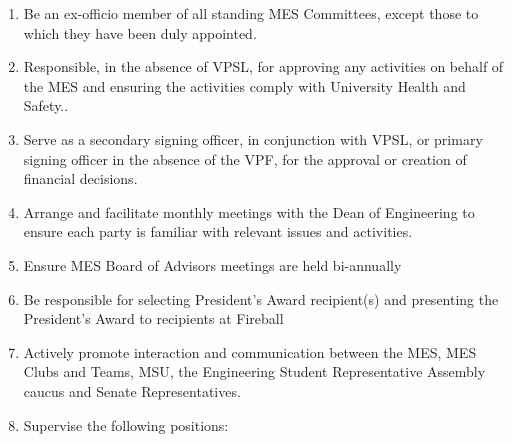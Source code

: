 \begin{enumerate}
  \begin{enumerate}
   \item
    Canadian Federation of Engineering Students (CFES)
   \item
    Engineering Student Societies' Council of Ontario (ESSCO)
  \end{enumerate}
 \item
  Be an ex-officio member of all standing MES Committees, except those to which they have been duly appointed.
 \item
  Responsible, in the absence of VPSL, for approving any activities on behalf of the MES and ensuring the activities comply with University Health and Safety..
 \item
  Serve as a secondary signing officer, in conjunction with VPSL, or primary signing officer in the absence of the VPF, for the approval or creation of financial decisions.
 \item
  Arrange and facilitate monthly meetings with the Dean of Engineering to ensure each party is familiar with relevant issues and activities.
 \item
  Ensure MES Board of Advisors meetings are held bi-annually
 \item
  Be responsible for selecting President's Award recipient(s) and presenting the President's Award to recipients at Fireball
 \item
  Actively promote interaction and communication between the MES, MES Clubs and Teams, MSU, the Engineering Student Representative Assembly caucus and Senate Representatives.
 \item
  Supervise the following positions:


\end{enumerate}
